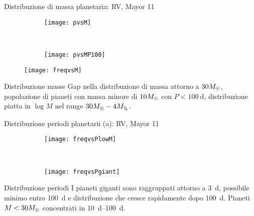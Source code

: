 \begin{frame}{Distribuzione di massa planetaria: RV, Mayor 11}
\begin{figure}[!ht] \begin{subfigure}[b]{0.47\textwidth}
\centering \texttt{[image: pvsM]} \label{fig:pvsM} \end{subfigure}
~
\begin{subfigure}[b]{0.47\textwidth} \centering \texttt{[image: pvsMP100]}\label{fig:pvsMP100}
\end{subfigure}
\end{figure} 

\begin{figure}[!ht]\texttt{[image: freqvsM]}\label{fig:freqvsM}
\end{figure}

\end{frame}

\begin{wordonframe}{Distribuzione masse}
Gap nella distribuzione di massa attorno a $30M_{\oplus}{}$, popolazione di pianeti con massa minore di $10M_{\oplus}{}$ con $P<\SI{100}{\day}$, distribuzione piatta in $\log{M}$ nel range $30\mearth{}-4\mjupiter{}$.
\end{wordonframe}

\begin{frame}{Distribuzione periodi planetarii (a): RV, Mayor 11}
\begin{figure}[!ht]
\begin{subfigure}[b]{0.47\textwidth} \centering \texttt{[image: freqvsPlowM]}\label{fig:freqvsPlowM}\end{subfigure}
~
\begin{subfigure}[b]{0.47\textwidth} \centering \texttt{[image: freqvsPgiant]} \label{fig:freqvsPgiant} \end{subfigure}
\end{figure}
\end{frame}

\begin{wordonframe}{Distribuzione periodi}
I pianeti giganti sono raggruppati attorno a \SI{3}{\day}, possibile minimo entro \SI{100}{\day} e distribuzione che cresce rapidamente dopo \SI{100}{\day}.
Pianeti $M<30M_{\oplus}{}$ concentrati in \SIrange{10}{100}{\day}.
\end{wordonframe}

